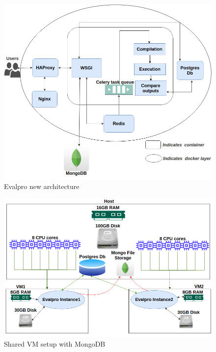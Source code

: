 \documentclass[sigconf]{acmart}
\begin{document}
\begin{figure}[!htb]
  \centering
  \includegraphics[width=\linewidth]{Pictures/architecture_mongo.png}
  \caption{Evalpro new architecture}
  \label{architecture_mongo}
\end{figure}

\begin{figure}[!htb]
  \centering
  \includegraphics[width=\linewidth]{Pictures/shared_vm_mongo.png}
  \caption{Shared VM setup with  MongoDB}
  \label{shared_vm_mongo}
\end{figure}
\end{document}
